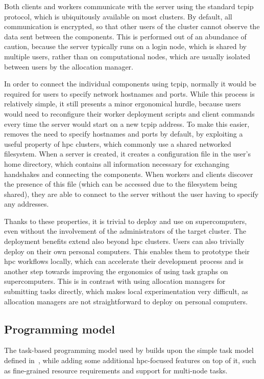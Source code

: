 Both clients and workers communicate with the server using the standard \gls{tcpip}
protocol, which is ubiquitously available on most clusters. By default, all communication is
encrypted, so that other users of the cluster cannot observe the data sent between the
\hyperqueue{} components. This is performed out of an abundance of caution, because the
server typically runs on a login node, which is shared by multiple users, rather than on
computational nodes, which are usually isolated between users by the allocation manager.

In order to connect the individual components using \gls{tcpip}, normally it would be
required for users to specify network hostnames and ports. While this process is relatively simple,
it still presents a minor ergonomical hurdle, because users would need to reconfigure their worker
deployment scripts and client commands every time the server would start on a new
\gls{tcpip} address. To make this easier, \hyperqueue{} removes the need to
specify hostnames and ports by default, by exploiting a useful property of \gls{hpc}
clusters, which commonly use a shared networked filesystem. When a server is created, it creates a
configuration file in the user's home directory, which contains all information necessary for
exchanging handshakes and connecting the components. When workers and clients discover the presence
of this file (which can be accessed due to the filesystem being shared), they are able to connect
to the server without the user having to specify any addresses.

Thanks to these properties, it is trivial to deploy and use \hyperqueue{} on
supercomputers, even without the involvement of the administrators of the target cluster. The
deployment benefits extend also beyond \gls{hpc} clusters. Users can also trivially
deploy \hyperqueue{} on their own personal computers. This enables them to prototype
their \gls{hpc} workflows locally, which can accelerate their development process and
is another step towards improving the ergonomics of using task graphs on supercomputers. This is in
contrast with using allocation managers for submitting tasks directly, which makes local
experimentation very difficult, as allocation managers are not straightforward to deploy on
personal computers.


\subsection{Programming model}
\label{hq:programming-model}
The task-based programming model used by \hyperqueue{} builds upon the simple task model
defined in~, while adding some additional \gls{hpc}-focused
features on top of it, such as fine-grained resource requirements and support for multi-node tasks.

